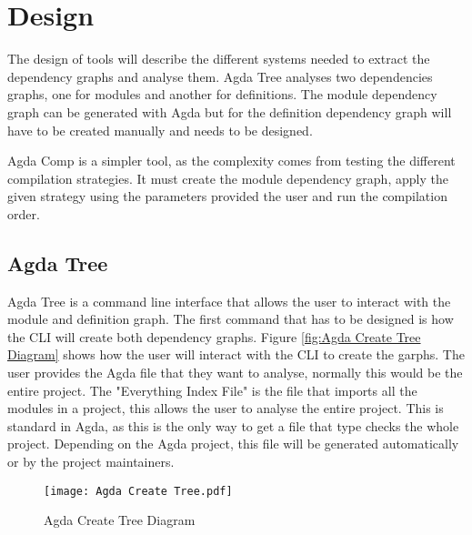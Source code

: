 
\chapter{Design}


The design of tools will describe the different systems needed to extract the
dependency graphs and analyse them. Agda Tree analyses two dependencies graphs,
one for modules and another for definitions. The module dependency graph can be
generated with Agda but for the definition dependency graph will have to be
created manually and needs to be designed.

Agda Comp is a simpler tool, as the complexity comes from testing the different
compilation strategies. It must create the module dependency graph, apply the
given strategy using the parameters provided the user and run the compilation
order. 

\begin{minipage}{\linewidth\fboxsep\fboxrule}

\section{Agda Tree}

Agda Tree is a command line interface that allows the user to interact with the
module and definition graph. The first command that has to be designed is how
the CLI will create both dependency graphs. Figure \ref{fig:Agda Create Tree
Diagram} shows how the user will interact with the CLI to create the garphs.
The user provides the Agda file that they want to analyse, normally this would
be the entire project. The "Everything Index File" is the file that imports all
the modules in a project, this allows the user to analyse the entire project.
This is standard in Agda, as this is the only way to get a file that type
checks the whole project. Depending on the Agda project, this file will be
generated automatically or by the project maintainers.

\begin{figure}[H]
    \centering
    \label{fig:Agda Create Tree Diagram}
    \texttt{[image: Agda Create Tree.pdf]}
    \caption{Agda Create Tree Diagram}
\end{figure} 

\pagebreak
\end{minipage}

